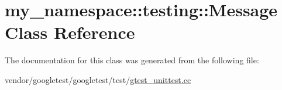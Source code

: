 \hypertarget{classmy__namespace_1_1testing_1_1_message}{}\section{my\+\_\+namespace\+:\+:testing\+:\+:Message Class Reference}
\label{classmy__namespace_1_1testing_1_1_message}


The documentation for this class was generated from the following file\+:\begin{DoxyCompactItemize}
\item 
vendor/googletest/googletest/test/\hyperlink{gtest__unittest_8cc}{gtest\+\_\+unittest.\+cc}\end{DoxyCompactItemize}
